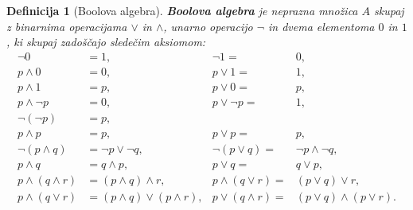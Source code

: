 \documentclass{beamer}
\newtheorem{definicija}[izrek]{Definicija}
\begin{document}
  \begin{frame}
    \begin{columns}
        \begin{column}{\textwidth}
            \begin{definicija}[Boolova algebra]
                {\bf Boolova algebra} je neprazna množica \(A\) skupaj z binarnima operacijama 
                \(\vee\)  in \(\wedge\), unarno operacijo \(\neg\)
                 in dvema  
                elementoma \(0\) in \(1\), ki skupaj zadoščajo sledečim aksiomom:
                \begin{align}
                    \label{eq0}
                    \neg 0 &= 1, & \neg 1 =& 0,\\ \label{eq1}
                    p \wedge 0 &= 0, & p \vee 1 =& 1,\\ \label{eq2}
                    p \wedge 1 &= p, & p \vee 0 =& p,\\ \label{eq3}
                    p \wedge \neg p &= 0, & p \vee \neg p =& 1,\\ \label{eq4}
                        \neg (\neg p) &= p,\\ \label{eq5}
                    p \wedge p &= p, & p \vee p =& p,\\ \label{eq6}
                    \neg (p \wedge q) &= \neg p \vee \neg q, & \neg (p \vee q) =& \neg p \wedge \neg q,\\ \label{eq7}
                    p \wedge q &= q \wedge p, & p \vee q =& q \vee p,\\ \label{eq8}
                    p \wedge (q \wedge r) &= (p \wedge q) \wedge r, & p \wedge (q \vee r) =& (p \vee q) \vee r,\\ \label{eq9}
                    p \wedge (q \vee r) &= (p \wedge q) \vee (p \wedge r), & p \vee (q \wedge r) =& (p \vee q) \wedge (p \vee r).
                \end{align}
            \end{definicija}
        \end{column}
    \end{columns}
  \end{frame}
\end{document}
